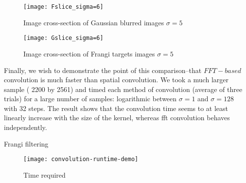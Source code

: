 \begin{figure}
  \centering
  \texttt{[image: Fslice\_sigma=6]}
  \caption{Image cross-section of Gaussian blurred images $\sigma=5$}
  \label{fig:cross-sec-G-sigma=5}
\end{figure}

\begin{figure}
  \centering
  \texttt{[image: Gslice\_sigma=6]}
  \caption{Image cross-section of Frangi targets images $\sigma=5$}
  \label{fig:cross-sec-F-sigma=5}
\end{figure}


Finally, we wish to demonstrate the point of this comparison--that $FFT-based$ convolution is much faster than spatial convolution. We took a much larger sample ( 2200 by 2561) and timed each method of convolution (average of three trials) for a large number of samples: logarithmic between $\sigma=1$ and $\sigma=128$ with 32 steps. The result shows that the convolution time seems to at least linearly increase with the size of the kernel, whereas fft convolution behaves independently.

Frangi filtering

\begin{figure}
  \texttt{[image: convolution-runtime-demo]}
  \caption{Time required}
\end{figure}